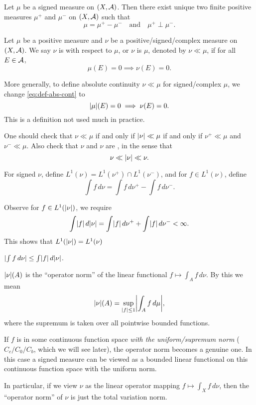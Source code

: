\begin{namedthm}
    Let $\mu$ be a signed measure on $(X,\mathcal{A})$. Then there exist unique two finite positive measures $\mu^+$ and $\mu^-$ on $(X,\mathcal{A})$ such that \[
        \mu = \mu^+ - \mu^- \quad \text{and} \quad \mu^+ \perp \mu^-.
    \]
\end{namedthm}
\begin{defn} \label{def:abs-cont}
     Let $\mu$ be a positive measure and $\nu$ be a positive/signed/complex measure on $(X, \mathcal{A})$. We say $\nu$ is  with respect to $\mu$, or $\nu$ is  $\mu$, denoted by $\nu \ll \mu$, if for all $E\in \mathcal{A}$, \begin{equation} \label{eq:def-abs-cont}
         \mu(E) = 0 \implies \nu(E) = 0.
     \end{equation}
        
    More generally, to define absolute continuity $\nu \ll \mu$ for signed/complex $\mu$, we change \eqref{eq:def-abs-cont} to \begin{equation} \label{eq:def-abs-cont-sign-cplx}
        \abs{\mu}(E) = 0 \implies \nu(E) = 0.
    \end{equation} This is a definition not used much in practice.
\end{defn}
One should check that $\nu \ll \mu$ if and only if $\lvert \nu \rvert \ll \mu$ if and only if $\nu^+ \ll \mu$ and $\nu^- \ll \mu$. Also check that $\nu$ and $\nu$ are , in the sense that \[
    \nu \ll \lvert \nu \rvert \ll \nu.
\]

For signed $\nu$, define $L^1(\nu) = L^1(\nu^+) \cap L^1(\nu^-)$, and for $f \in L^1(\nu)$, define \[
    \int f\,d\nu = \int f\,d\nu^+ - \int f\,d\nu^-.
\]

Observe for $f \in L^1(\lvert \nu \rvert)$, we require 
\[
    \int \lvert f \rvert\,d\lvert \nu \rvert = \int \lvert f \rvert\,d\nu^+ + \int \lvert f \rvert\,d\nu^- < \infty.
\] This shows that $L^1(\lvert \nu \rvert) = L^1(\nu)$

$\lvert \int f\,d\nu \rvert \leq \int \lvert f \rvert \,d\lvert \nu \rvert$.

\begin{prop} \label{prop:signed-meas-op-norm}
    $\lvert \nu \rvert(A)$ is the ``operator norm'' of the linear functional $f \mapsto \int_A f\,d\nu$. By this we mean \[
        \lvert \nu \rvert(A) = \sup_{\lvert f \rvert \leq 1} \biggl\vert \int_A f\,d\mu\biggr\vert,
    \] where the supremum is taken over all pointwise bounded functions.
    
    If $f$ is in some continuous function space \emph{with the uniform/supremum norm} ($C_c/C_0/C_b$, which we will see later), the operator norm becomes a genuine one. In this case a signed measure can be viewed as a bounded linear functional on this continuous function space with the uniform norm.

    In particular, if we view $\nu$ as the linear operator mapping $f \mapsto \int_X f\,d\nu$, then the ``operator norm'' of $\nu$ is just the total variation norm.
\end{prop}


